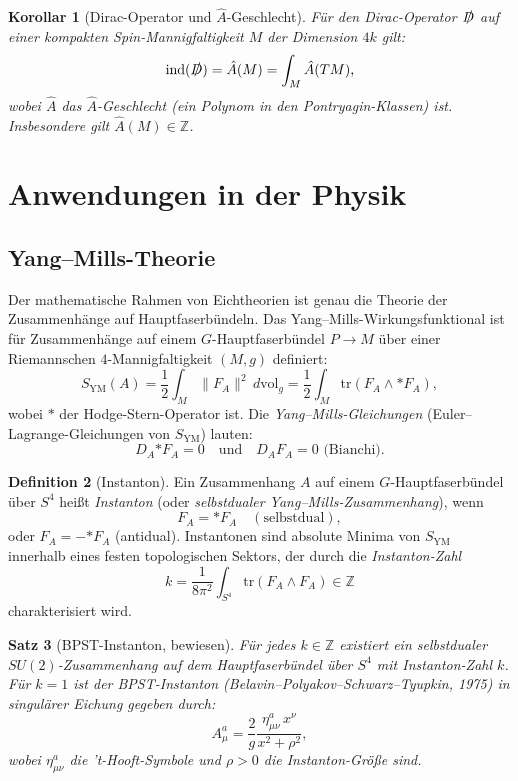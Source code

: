 \documentclass[12pt,a4paper]{amsart}
\newtheorem{theorem}{Satz}[section]
\newtheorem{corollary}[theorem]{Korollar}
\theoremstyle{definition}
\newtheorem{definition}[theorem]{Definition}
\begin{document}
\begin{corollary}[Dirac-Operator und $\hat{A}$-Geschlecht]
Für den Dirac-Operator $\slashed{D}$ auf einer kompakten Spin-Mannigfaltigkeit
$M$ der Dimension $4k$ gilt:
\[
  \mathrm{ind}(\slashed{D}) = \hat{A}(M) = \int_M \hat{A}(TM),
\]
wobei $\hat{A}$ das $\hat{A}$-Geschlecht (ein Polynom in den Pontryagin-Klassen)
ist. Insbesondere gilt $\hat{A}(M) \in \mathbb{Z}$.
\end{corollary}

\section{Anwendungen in der Physik}
\label{sec:physik}

\subsection{Yang--Mills-Theorie}

Der mathematische Rahmen von Eichtheorien ist genau die Theorie der Zusammenhänge
auf Hauptfaserbündeln. Das Yang--Mills-Wirkungsfunktional ist für Zusammenhänge
auf einem $G$-Hauptfaserbündel $P \to M$ über einer Riemannschen $4$-Mannigfaltigkeit
$(M, g)$ definiert:
\[
  S_{\mathrm{YM}}(A) = \frac{1}{2} \int_M \|F_A\|^2 \, d\mathrm{vol}_g
  = \frac{1}{2} \int_M \mathrm{tr}(F_A \wedge {*F_A}),
\]
wobei $*$ der Hodge-Stern-Operator ist. Die \emph{Yang--Mills-Gleichungen}
(Euler--Lagrange-Gleichungen von $S_{\mathrm{YM}}$) lauten:
\[
  D_A {*F_A} = 0 \quad \text{und} \quad D_A F_A = 0 \text{ (Bianchi)}.
\]

\begin{definition}[Instanton]
Ein Zusammenhang $A$ auf einem $G$-Hauptfaserbündel über $S^4$ heißt
\emph{Instanton} (oder \emph{selbstdualer Yang--Mills-Zusammenhang}), wenn
\[
  F_A = {*F_A} \quad (\text{selbstdual}),
\]
oder $F_A = -{*F_A}$ (antidual). Instantonen sind absolute Minima von
$S_{\mathrm{YM}}$ innerhalb eines festen topologischen Sektors, der durch die
\emph{Instanton-Zahl}
\[
  k = \frac{1}{8\pi^2} \int_{S^4} \mathrm{tr}(F_A \wedge F_A) \in \mathbb{Z}
\]
charakterisiert wird.
\end{definition}

\begin{theorem}[BPST-Instanton, bewiesen]
\label{thm:bpst}
Für jedes $k \in \mathbb{Z}$ existiert ein selbstdualer $SU(2)$-Zusammenhang
auf dem Hauptfaserbündel über $S^4$ mit Instanton-Zahl $k$. Für $k=1$ ist der
\emph{BPST-Instanton} (Belavin--Polyakov--Schwarz--Tyupkin, 1975) in singulärer
Eichung gegeben durch:
\[
  A_\mu^a = \frac{2}{g} \frac{\eta_{\mu\nu}^a \, x^\nu}{x^2 + \rho^2},
\]
wobei $\eta^a_{\mu\nu}$ die 't-Hooft-Symbole und $\rho > 0$ die Instanton-Größe sind.
\end{theorem}
\end{document}
